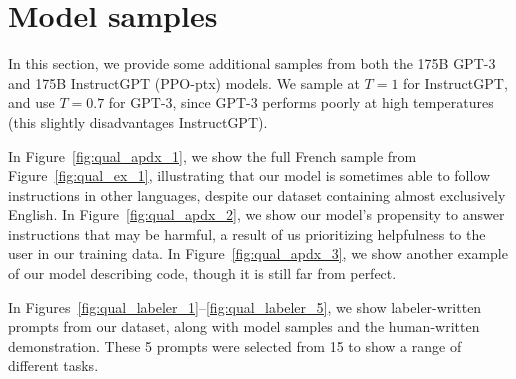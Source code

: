 \documentclass{article}
\begin{document}
\newpage
\section{Model samples}

In this section, we provide some additional samples from both the 175B GPT-3 and 175B InstructGPT (PPO-ptx) models. We sample at $T=1$ for InstructGPT, and use $T=0.7$ for GPT-3, since GPT-3 performs poorly at high temperatures (this slightly disadvantages InstructGPT). 

In Figure~\ref{fig:qual_apdx_1}, we show the full French sample from Figure~\ref{fig:qual_ex_1}, illustrating that our model is sometimes able to follow instructions in other languages, despite our dataset containing almost exclusively English. In Figure~\ref{fig:qual_apdx_2}, we show our model's propensity to answer instructions that may be harmful, a result of us prioritizing helpfulness to the user in our training data. In Figure~\ref{fig:qual_apdx_3}, we show another example of our model describing code, though it is still far from perfect.

In Figures~\ref{fig:qual_labeler_1}--\ref{fig:qual_labeler_5}, we show labeler-written prompts from our dataset, along with model samples and the human-written demonstration. These 5 prompts were selected from 15 to show a range of different tasks. 


\end{document}
